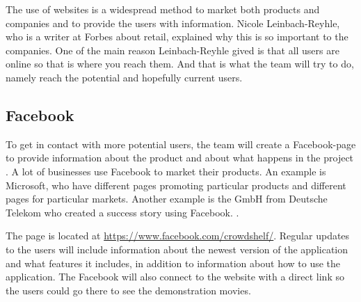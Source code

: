 The use of websites is a widespread method to market both products and companies and to provide the users with information. Nicole Leinbach-Reyhle, who is a writer at Forbes about retail, explained why this is so important to the companies. One of the main reason Leinbach-Reyhle gived is that all users are online so that is where you reach them.\cite{reason-online-marketing} And that is what the team will try to do, namely reach the potential and hopefully current users.

\subsection{Facebook}
To get in contact with more potential users, the team will create a Facebook-page to provide information about the product and about what happens in the project .\cite{facebook} A lot of businesses use Facebook to market their products. An example is Microsoft, who have different pages promoting particular products and different pages for particular markets. 
Another example is the GmbH from Deutsche Telekom who created a success story using Facebook. \cite{deutsche-succsess}.
 
The page is located at \url{https://www.facebook.com/crowdshelf/}. Regular updates to the users will include information about the newest version of the application and what features it includes, in addition to information about how to use the application. The Facebook will also connect to the website with a direct link so the users could go there to see the demonstration movies.



